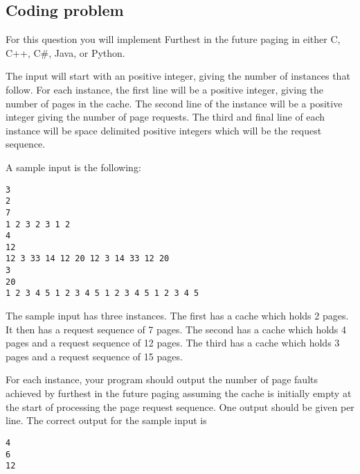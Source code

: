 \documentclass[solutionorbox,answers]{exam}
\begin{document}
\begin{questions}
\newpage

\question

\section*{Coding problem}
For this question you will implement Furthest in the future paging in either C, C++, C\#, Java, or Python.  

The input will start with an positive integer, giving the number of instances that follow. For each instance, the first line will be a positive integer, giving the number of pages in the cache. The second line of the instance will be a positive integer giving the number of page requests.
The third and final line of each instance will be space delimited positive integers which will be the request sequence.

A sample input is the following:
\begin{verbatim}
3
2
7
1 2 3 2 3 1 2
4
12
12 3 33 14 12 20 12 3 14 33 12 20 
3
20
1 2 3 4 5 1 2 3 4 5 1 2 3 4 5 1 2 3 4 5

\end{verbatim}
The sample input has three instances. The first has a cache which holds 2 pages. It then has a request sequence of 7 pages.
The second has a cache which holds 4 pages and a request sequence of 12 pages.
The third has a cache which holds 3 pages and a request sequence of 15 pages.

For each instance, your program should output the number of page faults achieved by furthest in the future paging assuming the cache is initially empty at the start of processing the page request sequence. One output should be given per line. The correct output for the sample input is
\begin{verbatim}
4
6
12

\end{verbatim}


\end{questions}
\end{document}
